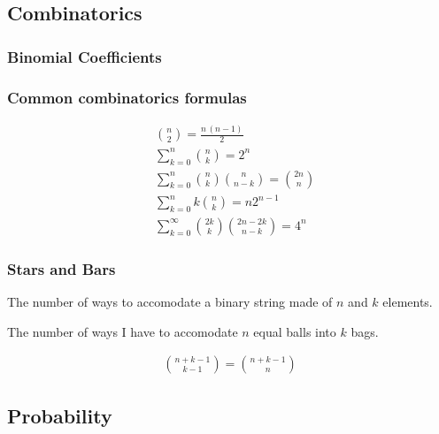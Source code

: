 \documentclass[letterpaper,landscape]{article}
\begin{document}
\subsection{Combinatorics}

\subsubsection{Binomial Coefficients}



\subsubsection{Common combinatorics formulas}

\begin{align}
    &\displaystyle \binom{n}{2} = \frac{n \, (n-1)}{2} \\
    &\displaystyle \sum_{k=0}^{n} \binom{n}{k} = 2^n \\
    &\displaystyle \sum_{k=0}^n \binom{n}{k} \binom{n}{n-k} = \binom{2n}{n} \\
    &\displaystyle \sum_{k=0}^n k \binom{n}{k} = n2^{n-1} \\
    &\displaystyle \sum_{k=0}^\infty \binom{2k}{k} \binom{2n-2k}{n-k} = 4^n
\end{align}

\subsubsection{Stars and Bars}

The number of ways to accomodate a binary string made of $n$ and $k$ elements.

\noindent The number of ways I have to accomodate $n$ equal balls into $k$ bags.

\begin{align*}
  \displaystyle \binom{n +  k - 1}{k - 1} = \binom{n + k - 1}{n}
\end{align*}

\subsection{Probability}
\end{document}
